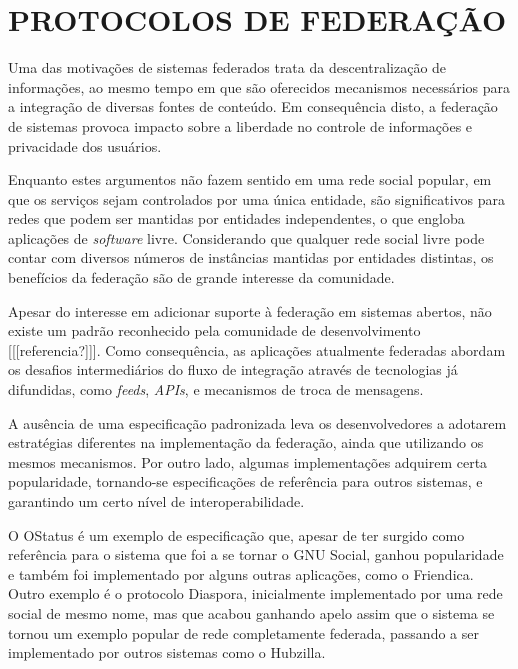 \section{PROTOCOLOS DE FEDERAÇÃO}


Uma das motivações de sistemas federados trata da descentralização de informações, ao
mesmo tempo em que são oferecidos mecanismos necessários para a integração de
diversas fontes de conteúdo. Em consequência disto, a federação de sistemas provoca
impacto sobre a liberdade no controle de informações e privacidade dos usuários.

Enquanto estes argumentos não fazem sentido em uma rede social popular, em que os
serviços sejam controlados por uma única entidade, são significativos para redes que
podem ser mantidas por entidades independentes, o que engloba aplicações de
\textit{software} livre. Considerando que qualquer rede social livre pode contar com
diversos números de instâncias mantidas por entidades distintas, os benefícios da
federação são de grande interesse da comunidade.

Apesar do interesse em adicionar suporte à federação em sistemas abertos, não existe
um padrão reconhecido pela comunidade de desenvolvimento [[[referencia?]]]. Como
consequência, as aplicações atualmente federadas abordam os desafios intermediários
do fluxo de integração através de tecnologias já difundidas, como \textit{feeds},
\textit{APIs}, e mecanismos de troca de mensagens.

A ausência de uma especificação padronizada leva os desenvolvedores a adotarem
estratégias diferentes na implementação da federação, ainda que utilizando os mesmos
mecanismos. Por outro lado, algumas implementações adquirem certa popularidade,
tornando-se especificações de referência para outros sistemas, e garantindo um certo
nível de interoperabilidade.

O OStatus é um exemplo de especificação que, apesar de ter surgido como referência
para o sistema que foi a se tornar o GNU Social, ganhou popularidade e também foi
implementado por alguns outras aplicações, como o Friendica. Outro exemplo é o
protocolo Diaspora, inicialmente implementado por uma rede social de mesmo nome, mas
que acabou ganhando apelo assim que o sistema se tornou um exemplo popular de rede
completamente federada, passando a ser implementado por outros sistemas como o
Hubzilla.

